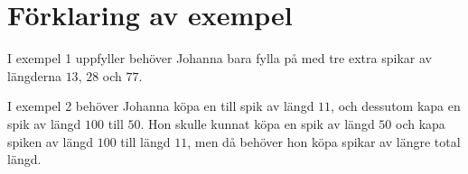 \section*{Förklaring av exempel}
I exempel 1 uppfyller behöver Johanna bara fylla på med tre extra spikar av längderna $13$, $28$ och $77$.

I exempel 2 behöver Johanna köpa en till spik av längd $11$, och dessutom kapa en spik av längd $100$ till $50$.
Hon skulle kunnat köpa en spik av längd $50$ och kapa spiken av längd $100$ till längd $11$, 
men då behöver hon köpa spikar av längre total längd.
